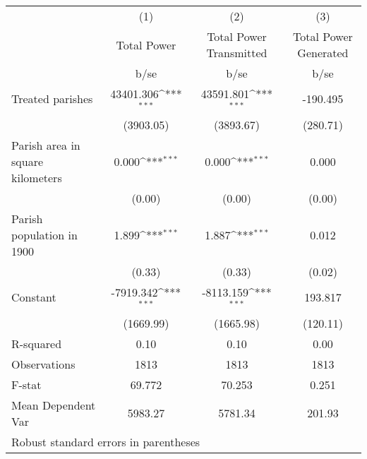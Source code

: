 {
\def\sym#1{\ifmmode^{#1}\else\(^{#1}\)\fi}
\begin{tabular}{l*{3}{c}}
\hline\hline
                    &\multicolumn{1}{c}{(1)}         &\multicolumn{1}{c}{(2)}         &\multicolumn{1}{c}{(3)}         \\
                    & Total Power         &Total Power Transmitted         &Total Power Generated         \\
                    &        b/se         &        b/se         &        b/se         \\
\hline
Treated parishes    &   43401.306\sym{***}&   43591.801\sym{***}&    -190.495         \\
                    &   (3903.05)         &   (3893.67)         &    (280.71)         \\
Parish area in square kilometers&       0.000\sym{***}&       0.000\sym{***}&       0.000         \\
                    &      (0.00)         &      (0.00)         &      (0.00)         \\
Parish population in 1900&       1.899\sym{***}&       1.887\sym{***}&       0.012         \\
                    &      (0.33)         &      (0.33)         &      (0.02)         \\
Constant            &   -7919.342\sym{***}&   -8113.159\sym{***}&     193.817         \\
                    &   (1669.99)         &   (1665.98)         &    (120.11)         \\
\hline
R-squared           &        0.10         &        0.10         &        0.00         \\
Observations        &        1813         &        1813         &        1813         \\
F-stat              &      69.772         &      70.253         &       0.251         \\
Mean Dependent Var  &     5983.27         &     5781.34         &      201.93         \\
\hline\hline
\multicolumn{4}{l}{\footnotesize Robust standard errors in parentheses}\\
\end{tabular}
}
